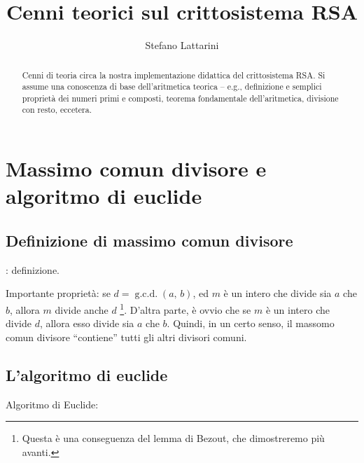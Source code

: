 \documentclass[pdflatex,11pt,a4paper,oneside]{article}
\newcommand{\theauthor}[0]{Stefano Lattarini}
\newcommand{\thetitle}[0]{Cenni teorici sul crittosistema RSA}
\newcommand{\XXX}[1][XXX]{\text{\bfseries{\color{red}{\emph{#1}}}}}
\newcommand{\TODO}[0]{\XXX[TODO]}
\newcommand{\gcdop}[0]{\ensuremath{\operatorname{g.c.d.}}}
\newcommand{\xgcd}[1]{\ensuremath{\gcdop\left({#1}\right)}}
\renewcommand{\gcd}[2]{\xgcd{{#1},\,{#2}}}
\numberwithin{equation}{section}
\begin{document}
\title{\thetitle}
\author{\theauthor}

\maketitle


\begin{abstract}
  Cenni di teoria circa la nostra implementazione didattica del
  crittosistema RSA.  Si assume una conoscenza di base dell'aritmetica
  teorica -- e.g., definizione e semplici propriet\`a dei numeri primi
  e composti, teorema fondamentale dell'aritmetica, divisione con resto,
  eccetera.
\end{abstract}


\section{Massimo comun divisore e algoritmo di euclide}


\subsection{Definizione di massimo comun divisore}

\TODO: definizione.

Importante propriet\`a: se $d = \gcd{a}{b}$, ed $m$ \`e un intero che
divide sia $a$ che $b$, allora $m$ divide anche $d$%
\footnote{%
  Questa \`e una conseguenza del lemma di Bezout, che dimostreremo
  pi\`u avanti.%
}.
D'altra parte, \`e ovvio che se $m$ \`e un intero che divide $d$, allora
esso divide sia $a$ che $b$.
Quindi, in un certo senso, il massomo comun divisore ``contiene'' tutti
gli altri divisori comuni.


\subsection{L'algoritmo di euclide}

Algoritmo di Euclide:

\TODO
\end{document}
